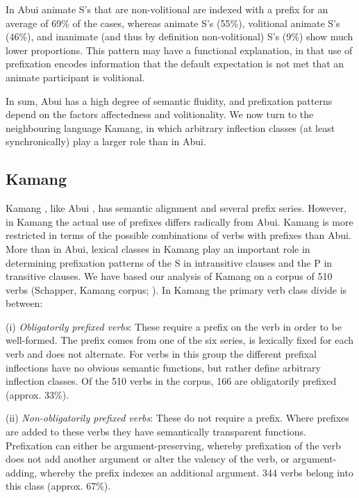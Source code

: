 In Abui  animate S's that are non-volitional are indexed with a prefix for an average of 69\% of the cases, whereas animate S's (55\%), volitional animate S's (46\%), and inanimate (and thus by definition non-volitional) S's (9\%) show much lower proportions. This pattern may have a functional explanation, in that use of prefixation encodes information that the default expectation is not met that an animate participant is volitional.

In sum, Abui  has a high degree of semantic fluidity, and prefixation patterns depend on the factors affectedness and volitionality. We now turn to the neighbouring language Kamang, in which arbitrary inflection classes (at least synchronically) play a larger role than in Abui.
 

\subsection{Kamang} 
\label{sec:10:5.2}
Kamang , like Abui , has semantic alignment  and several prefix series. However, in Kamang  the actual use of prefixes differs radically from Abui. Kamang  is more restricted in terms of the possible combinations of verbs with prefixes than Abui. More than in Abui, lexical classes  in Kamang  play an important role in determining prefixation patterns of the S in intransitive clauses and the P in transitive clauses. We have based our analysis of Kamang  on a corpus of 510 verbs (Schapper, Kamang  corpus; \citet{SchapperEtAl2011}). In Kamang  the primary verb class divide is between: 

(i)  \textit{Obligatorily prefixed verbs}: These require a prefix on the verb in order to be well-formed. The prefix comes from one of the six series, is lexically fixed for each verb and does not alternate. For verbs in this group the different prefixal inflections have no obvious semantic functions, but rather define arbitrary inflection classes. Of the 510 verbs in the corpus, 166 are obligatorily prefixed (approx. 33\%).

(ii) \textit{Non-obligatorily prefixed verbs}: These do not require a prefix. Where prefixes are added to these verbs they have semantically transparent functions. Prefixation can either be argument-preserving, whereby prefixation of the verb does not add another argument or alter the valency of the verb, or argument-adding, whereby the prefix indexes an additional argument. 344 verbs belong into this class (approx. 67\%).

